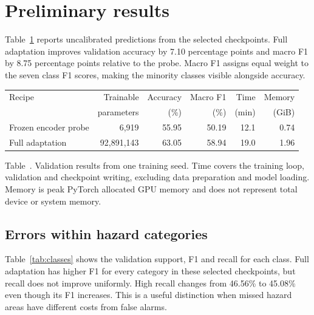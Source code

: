 \documentclass[10pt,a4paper]{article}
\begin{document}
\section{Preliminary results}

Table~\ref{tab:results} reports uncalibrated predictions from the selected
checkpoints. Full adaptation improves validation accuracy by 7.10 percentage
points and macro F1 by 8.75 percentage points relative to the probe. Macro F1
assigns equal weight to the seven class F1 scores, making the minority classes
visible alongside accuracy.

\begin{table}[!htb]
\centering
\small
{}\label{tab:results}
\begin{tabular}{lrrrrr}
\toprule
Recipe & Trainable & Accuracy & Macro F1 & Time & Memory \\
       & parameters & (\%) & (\%) & (min) & (GiB) \\
\midrule
Frozen encoder probe & 6,919 & 55.95 & 50.19 & 12.1 & 0.74 \\
Full adaptation & 92,891,143 & 63.05 & 58.94 & 19.0 & 1.96 \\
\bottomrule
\end{tabular}
\medskip
\parbox{\textwidth}{Table~\thetable. Validation results from one training
seed. Time covers the training
loop, validation and checkpoint writing, excluding data preparation and
model loading. Memory is peak PyTorch allocated GPU memory and does not
represent total device or system memory.}
\end{table}

\subsection{Errors within hazard categories}

Table~\ref{tab:classes} shows the validation support, F1 and recall for each
class. Full adaptation has higher F1 for every category in these selected
checkpoints, but recall does not improve uniformly. High recall changes from
46.56\% to 45.08\% even though its F1 increases. This is a useful distinction
when missed hazard areas have different costs from false alarms.
\end{document}
